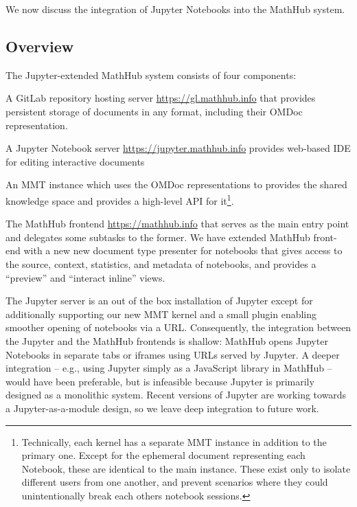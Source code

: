 We now discuss the integration of Jupyter Notebooks into the MathHub system.

\subsection{Overview}

The Jupyter-extended MathHub system consists of four components:
\begin{compactenum}
\item A GitLab repository hosting server \url{https://gl.mathhub.info} that provides persistent storage of documents in any format, including their OMDoc representation.
\item A Jupyter Notebook server \url{https://jupyter.mathhub.info} provides web-based IDE for editing interactive documents
\item An MMT instance which uses the OMDoc representations to provides the shared knowledge space and provides a high-level API for it\footnote{
    Technically, each kernel has a separate MMT instance in addition to the primary one. 
    Except for the ephemeral document representing each Notebook, these are identical to the main instance. 
    These exist only to isolate different users from one another, and prevent scenarios where they could unintentionally break each others notebook sessions.  
  }.
\item The MathHub frontend \url{https://mathhub.info} that serves as the main entry point and delegates some subtasks to the former.
  We have extended MathHub front-end with a new new document type presenter for notebooks that gives access to the source, context, statistics, and metadata of notebooks, and provides a ``preview'' and ``interact inline'' views.  
\end{compactenum}

The Jupyter server is an out of the box installation of Jupyter except for additionally supporting our new MMT kernel and a small plugin enabling smoother opening of notebooks via a URL. 
Consequently, the integration between the Jupyter and the MathHub frontends is shallow: MathHub opens Jupyter Notebooks in separate tabs or iframes using URLs served by Jupyter.
A deeper integration -- e.g., using Jupyter simply as a JavaScript library in MathHub -- would have been preferable, but is infeasible because Jupyter is primarily designed as a monolithic system.
Recent versions of Jupyter are working towards a Jupyter-as-a-module design, so we leave deep integration to future work.

